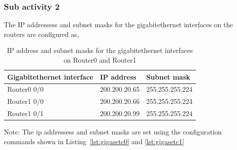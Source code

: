 \documentclass{lab_sheet}
\newcommand{\setting}[2]{
    \begin{tabular}{C{3cm}C{5cm}C{5cm}}
        \toprule
          #1 & IP address & Subnet mask\\
          \midrule
          #2
          \bottomrule
       \end{tabular}
}
\begin{document}
    \subsubsection*{Sub activity 2}
    The IP addressess and subnet masks for the gigabitethernet interfaces on the routers are configured as,
    \begin{table}[H]
        \centering
        \begin{threeparttable}
        \setting{Gigabitethernet interface}{
        Router0 0/0 & 200.200.20.65  & 255.255.255.224 \\
        Router1 0/0 & 200.200.20.66  & 255.255.255.224 \\
        Router1 0/1 & 200.200.20.99  & 255.255.255.224 \\
       }
  \begin{tablenotes}
    \small
    \item Note: The ip addressess and subnet masks are set using the configuration commands shown in Listing~\ref{lst:gigasetc0} and \ref{lst:gigasetc1}
  \end{tablenotes}
  \caption{IP address and subnet masks for the gigabitethernet interfaces on Router0 and Router1}
  \label{tbl:routersettingc}
        \end{threeparttable}
    \end{table}
    \begin{mdframed}[backgroundcolor=bg,innerbottommargin=-2.5em]
        
          \end{mdframed}
          \begin{mdframed}[backgroundcolor=bg,innerbottommargin=-2.5em]
              
                \end{mdframed}
\end{document}
